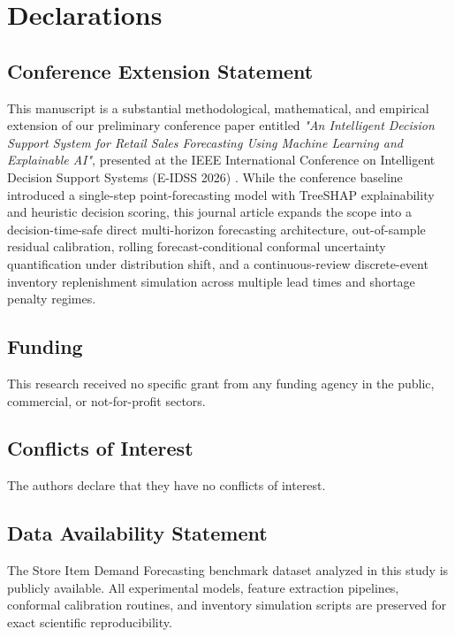 \documentclass[11pt,a4paper]{article}
\begin{document}








\section*{Declarations}

\subsection*{Conference Extension Statement}
This manuscript is a substantial methodological, mathematical, and empirical extension of our preliminary conference paper entitled \textit{"An Intelligent Decision Support System for Retail Sales Forecasting Using Machine Learning and Explainable AI"}, presented at the IEEE International Conference on Intelligent Decision Support Systems (E-IDSS 2026) \cite{e_idss_ieee}. While the conference baseline introduced a single-step point-forecasting model with TreeSHAP explainability and heuristic decision scoring, this journal article expands the scope into a decision-time-safe direct multi-horizon forecasting architecture, out-of-sample residual calibration, rolling forecast-conditional conformal uncertainty quantification under distribution shift, and a continuous-review discrete-event inventory replenishment simulation across multiple lead times and shortage penalty regimes.

\subsection*{Funding}
This research received no specific grant from any funding agency in the public, commercial, or not-for-profit sectors.

\subsection*{Conflicts of Interest}
The authors declare that they have no conflicts of interest.

\subsection*{Data Availability Statement}
The Store Item Demand Forecasting benchmark dataset analyzed in this study is publicly available. All experimental models, feature extraction pipelines, conformal calibration routines, and inventory simulation scripts are preserved for exact scientific reproducibility.
\end{document}
